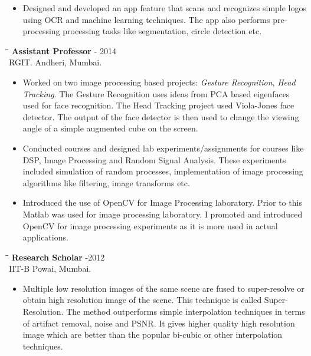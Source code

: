 \documentclass{res}
\begin{document}
\begin{resume}
\begin{itemize}
        \item Designed and developed an app feature that scans and recognizes
        simple logos using OCR and machine learning techniques. The app also performs pre-processing processing tasks like segmentation, circle detection etc. 
    \end{itemize}

   \begin{tabbing}
   \hspace{2.3in}\= \hspace{2.6in}\= \kill %
    {\bf Assistant Professor} \> -  2014\\
                     RGIT.\>     \>Andheri, Mumbai.
   \end{tabbing}
   \begin{itemize}
\item Worked on  two image processing based projects: \textit{Gesture Recognition}, \textit{Head Tracking}. The Gesture Recognition 
uses ideas from PCA based eigenfaces used for face recognition.  The Head Tracking project used Viola-Jones face detector. The output of the face detector is then used to change the viewing angle of a simple augmented cube on the screen.  
  
\item Conducted courses and designed  lab experiments/assignments for courses
like DSP, Image Processing and Random Signal Analysis. These experiments included simulation of random processes,
 implementation of image processing algorithms like filtering, image transforms etc.  
\item Introduced the use of OpenCV for Image Processing laboratory. Prior to this Matlab was used for image processing laboratory. I promoted and introduced OpenCV for image processing experiments as it is more used in actual applications. 
\end{itemize}

   \begin{tabbing}%
   \hspace{2.3in}\= \hspace{2.6in}\= \kill %
   {\bf Research Scholar}  \>  -2012\\
                IIT-B\>    \>Powai, Mumbai.
   \end{tabbing}
 \begin{itemize}
\item Multiple low resolution images of the same scene are fused to super-resolve or obtain
high resolution image of the scene. This technique is called Super-Resolution. The method outperforms simple interpolation techniques in terms of  artifact removal, noise and PSNR. 
It gives higher quality high resolution image which are better than the popular bi-cubic or other interpolation techniques. 


\end{itemize}
\end{resume}
\end{document}
